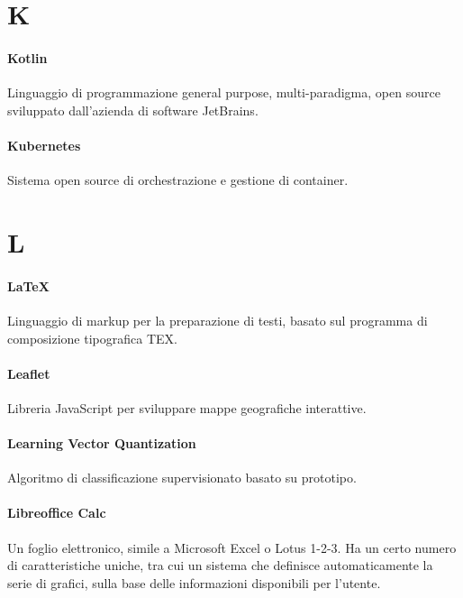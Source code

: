 \documentclass[]{article}
\begin{document}
	\newpage

	\section*{K}

	\paragraph*{Kotlin}
	Linguaggio di programmazione general purpose, multi-paradigma, open source sviluppato dall'azienda di software JetBrains.

	\paragraph*{Kubernetes}
	Sistema open source di orchestrazione e gestione di container.

	\newpage

	\section*{L}

	\paragraph*{LaTeX}
	Linguaggio di markup per la preparazione di testi, basato sul programma di composizione tipografica TEX.

	\paragraph*{Leaflet}
	Libreria JavaScript per sviluppare mappe geografiche interattive.

	\paragraph*{Learning Vector Quantization}
	Algoritmo di classificazione supervisionato basato su prototipo.

	\paragraph*{Libreoffice Calc}
	Un foglio elettronico, simile a Microsoft Excel o Lotus 1-2-3. Ha un certo numero di caratteristiche uniche, tra cui un sistema che definisce automaticamente la serie di grafici, sulla base delle informazioni disponibili per l'utente.
\end{document}
